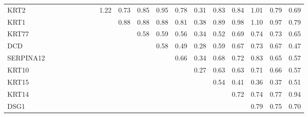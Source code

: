 \begin{longtable}{lrrrrrrrrrrrrrrrrrr}
KRT2      &               &            &           &              &               &            &            &       1.22 &        0.73 &      0.85 &            0.95 &        0.78 &        0.31 &        0.83 &       0.84 &         1.01 &         0.79 &       0.69 \\
KRT1      &               &            &           &              &               &            &            &            &        0.88 &      0.88 &            0.88 &        0.81 &        0.38 &        0.89 &       0.98 &         1.10 &         0.97 &       0.79 \\
KRT77     &               &            &           &              &               &            &            &            &             &      0.58 &            0.59 &        0.56 &        0.34 &        0.52 &       0.69 &         0.74 &         0.73 &       0.65 \\
DCD       &               &            &           &              &               &            &            &            &             &           &            0.58 &        0.49 &        0.28 &        0.59 &       0.67 &         0.73 &         0.67 &       0.47 \\
SERPINA12 &               &            &           &              &               &            &            &            &             &           &                 &        0.66 &        0.34 &        0.68 &       0.72 &         0.83 &         0.65 &       0.57 \\
KRT10     &               &            &           &              &               &            &            &            &             &           &                 &             &        0.27 &        0.63 &       0.63 &         0.71 &         0.66 &       0.57 \\
KRT15     &               &            &           &              &               &            &            &            &             &           &                 &             &             &        0.54 &       0.41 &         0.36 &         0.37 &       0.51 \\
KRT14     &               &            &           &              &               &            &            &            &             &           &                 &             &             &             &       0.72 &         0.74 &         0.77 &       0.94 \\
DSG1      &               &            &           &              &               &            &            &            &             &           &                 &             &             &             &            &         0.79 &         0.75 &       0.70 \\

\end{longtable}
